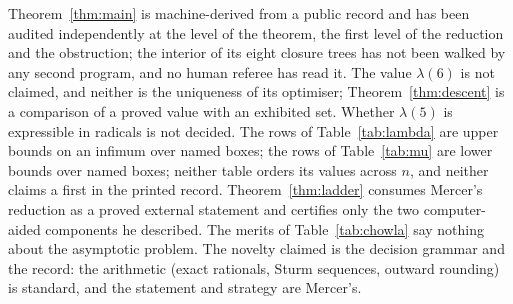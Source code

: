 \documentclass[11pt]{article}
\begin{document}
Theorem~\ref{thm:main} is machine-derived from a public record and has been audited independently at the level of the theorem, the first level of the reduction and the obstruction; the interior of its eight closure trees has not been walked by any second program, and no human referee has read it. The value $\lambda(6)$ is not claimed, and neither is the uniqueness of its optimiser; Theorem~\ref{thm:descent} is a comparison of a proved value with an exhibited set. Whether $\lambda(5)$ is expressible in radicals is not decided. The rows of Table~\ref{tab:lambda} are upper bounds on an infimum over named boxes; the rows of Table~\ref{tab:mu} are lower bounds over named boxes; neither table orders its values across $n$, and neither claims a first in the printed record. Theorem~\ref{thm:ladder} consumes Mercer's reduction as a proved external statement and certifies only the two computer-aided components he described. The merits of Table~\ref{tab:chowla} say nothing about the asymptotic problem. The novelty claimed is the decision grammar and the record: the arithmetic (exact rationals, Sturm sequences, outward rounding) is standard, and the statement and strategy are Mercer's.
\end{document}
